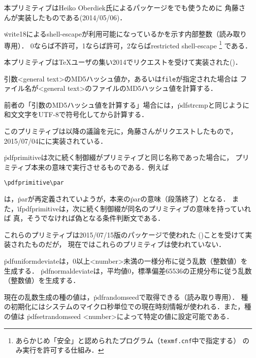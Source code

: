 \documentclass[a4paper,11pt,nomag]{jsarticle}
\begin{document}
\begin{cslist}
  本プリミティブはHeiko Oberdiek氏によるパッケージを\epTeX でも使うために
  角藤さんが実装したものである(2014/05/06)．
  
 \csitem[\.{pdfshellescape}]
  \.{write18}によるshell-escapeが利用可能になっているかを示す内部整数（読み取り専用）．
  0ならば不許可，1ならば許可，2ならばrestricted shell-escape%
  \footnote{あらかじめ「安全」と認められたプログラム（\texttt{texmf.cnf}中で指定する）
    のみ実行を許可する仕組み．}%
  である．
  
  本プリミティブは\TeX ユーザの集い2014でリクエストを受けて実装された(\cite{pdfse})．
  
  引数<general text>のMD5ハッシュ値か，あるいは\texttt{file}が指定された場合は
  ファイル名が<general text>のファイルのMD5ハッシュ値を計算する．

  前者の「引数のMD5ハッシュ値を計算する」場合には，\.{pdfstrcmp}と同じように
  和文文字をUTF-8で符号化してから計算する．

  このプリミティブは\cite{xe5}以降の議論を元に，角藤さんがリクエストしたもので，
  2015/07/04に\epTeX に実装されている．
  
  \.{pdfprimitive}は次に続く制御綴がプリミティブと同じ名称であった場合に，
  プリミティブ本来の意味で実行させるものである．例えば
\begin{verbatim}
\pdfprimitive\par
\end{verbatim}
  は，\.{par}が再定義されていようが，本来の\.{par}の意味（段落終了）となる．
  また，\.{ifpdfprimitive}は，次に続く制御綴が同名のプリミティブの意味を持っていれば
  真，そうでなければ偽となる条件判断文である．

  これらのプリミティブは2015/07/15版のパッケージで使われた
  (\cite{15715})ことを受けて実装されたものだが，
  現在ではこれらのプリミティブは使われていない．

  \.{pdfuniformdeviate}は，0以上<number>未満の一様分布に従う乱数（整数値）を生成する．
  \.{pdfnormaldeviate}は，平均値0，標準偏差65536の正規分布に従う乱数（整数値）を生成する．
  
  現在の乱数生成の種の値は，\.{pdfrandomseed}で取得できる（読み取り専用）．
  種の初期化にはシステムのマイクロ秒単位での現在時刻情報が使われる．また，種の値は
  \.{pdfsetrandomseed} <number>によって特定の値に設定可能である．
  

\end{cslist}
\end{document}
